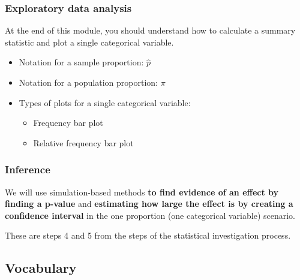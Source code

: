 \documentclass[
]{report}
\begin{document}
\subsubsection*{Exploratory data analysis}\label{exploratory-data-analysis}

At the end of this module, you should understand how to calculate a summary statistic and plot a single categorical variable.

\begin{itemize}
\item
  Notation for a sample proportion: \(\hat{p}\)
\item
  Notation for a population proportion: \(\pi\)
\item
  Types of plots for a single categorical variable:

  \begin{itemize}
  \item
    Frequency bar plot
  \item
    Relative frequency bar plot
  \end{itemize}
\end{itemize}

\subsubsection*{Inference}\label{inference}

We will use simulation-based methods \textbf{to find evidence of an effect by finding a p-value} and \textbf{estimating how large the effect is by creating a confidence interval} in the one proportion (one categorical variable) scenario.

These are steps 4 and 5 from the steps of the statistical investigation process.

\subsection{Vocabulary}\label{vocabulary-2}
\end{document}
